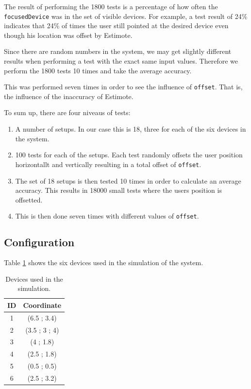 The result of performing the 1800 tests is a percentage of how often the \texttt{focusedDevice} was in the set of visible devices. For example, a test result of 24\% indicates that 24\% of times the user still pointed at the desired device even though his location was offset by Estimote.

Since there are random numbers in the system, we may get slightly different results when performing a test with the exact same input values. Therefore we perform the 1800 tests 10 times and take the average accuracy.

This was performed seven times in order to see the influence of \texttt{offset}. That is, the influence of the inaccuracy of Estimote.

To sum up, there are four niveaus of tests:

\begin{enumerate}
\item A number of setups. In our case this is 18, three for each of the six devices in the system.
\item 100 tests for each of the setups. Each test randomly offsets the user position horizontallt and vertically resulting in a total offset of \texttt{offset}.
\item The set of 18 setups is then tested 10 times in order to calculate an average accuracy. This results in 18000 small tests where the users position is offsetted.
\item This is then done seven times with different values of \texttt{offset}.
\end{enumerate}

\subsection{Configuration}

Table \ref{tbl:evaluation:system-correctness:devices} shows the six devices used in the simulation of the system.

\begin{table}[!hbt]
\centering
\caption{Devices used in the simulation.}
\label{tbl:evaluation:system-correctness:devices}
\begin{tabular}{c|c}
\textbf{ID} & \textbf{Coordinate} \\
\hline 
1           & (6.5 ; 3.4)         \\
2           & (3.5 ; 3 ; 4)       \\
3           & (4 ; 1.8)           \\
4           & (2.5 ; 1.8)         \\
5           & (0.5 ; 0.5)         \\
6           & (2.5 ; 3.2)        
\end{tabular}
\end{table}

